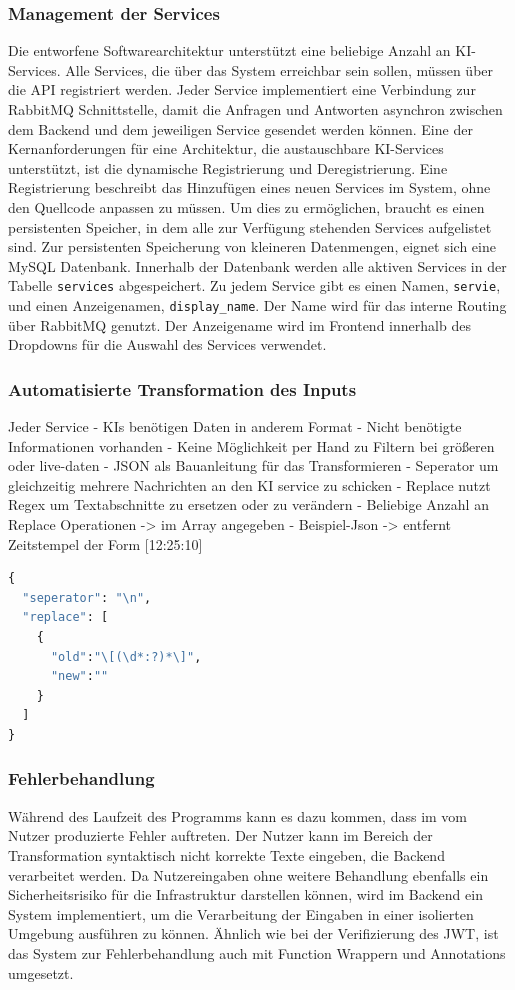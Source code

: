 \subsubsection{Management der Services}
Die entworfene Softwarearchitektur unterstützt eine beliebige Anzahl an KI-Services. Alle Services, die über das System erreichbar sein sollen, müssen über die API registriert werden. Jeder Service implementiert eine Verbindung zur RabbitMQ Schnittstelle, damit die Anfragen und Antworten asynchron zwischen dem Backend und dem jeweiligen Service gesendet werden können. Eine der Kernanforderungen für eine Architektur, die austauschbare KI-Services unterstützt, ist die dynamische Registrierung und Deregistrierung. Eine Registrierung beschreibt das Hinzufügen eines neuen Services im System, ohne den Quellcode anpassen zu müssen. Um dies zu ermöglichen, braucht es einen persistenten Speicher, in dem alle zur Verfügung stehenden Services aufgelistet sind. Zur persistenten Speicherung von kleineren Datenmengen, eignet sich eine MySQL Datenbank. Innerhalb der Datenbank werden alle aktiven Services in der Tabelle \texttt{services} abgespeichert. Zu jedem Service gibt es einen Namen, \texttt{servie}, und einen Anzeigenamen, \texttt{display\_{}name}. Der Name wird für das interne Routing über RabbitMQ genutzt. Der Anzeigename wird im Frontend innerhalb des Dropdowns für die Auswahl des Services verwendet.

\subsubsection{Automatisierte Transformation des Inputs}
Jeder Service
- KIs benötigen Daten in anderem Format
- Nicht benötigte Informationen vorhanden
- Keine Möglichkeit per Hand zu Filtern bei größeren oder live-daten
- JSON als Bauanleitung für das Transformieren
- Seperator um gleichzeitig mehrere Nachrichten an den KI service zu schicken
- Replace nutzt Regex um Textabschnitte zu ersetzen oder zu verändern
- Beliebige Anzahl an Replace Operationen -> im Array angegeben
- Beispiel-Json -> entfernt Zeitstempel der Form [12:25:10]

\begin{lstlisting}[language=Python]
{
  "seperator": "\n",
  "replace": [
    {
      "old":"\[(\d*:?)*\]",
      "new":""
    }
  ]
}
\end{lstlisting}

\subsubsection{Fehlerbehandlung}
Während des Laufzeit des Programms kann es dazu kommen, dass im vom Nutzer produzierte Fehler auftreten. Der Nutzer kann im Bereich der Transformation syntaktisch nicht korrekte Texte eingeben, die Backend verarbeitet werden. Da Nutzereingaben ohne weitere Behandlung ebenfalls ein Sicherheitsrisiko für die Infrastruktur darstellen können, wird im Backend ein System implementiert, um die Verarbeitung der Eingaben in einer isolierten Umgebung ausführen zu können. Ähnlich wie bei der Verifizierung des JWT, ist das System zur Fehlerbehandlung auch mit Function Wrappern und Annotations umgesetzt. 

